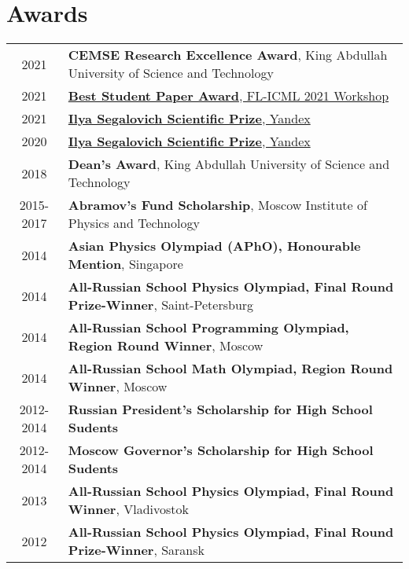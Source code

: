 \documentclass[a4paper,10pt]{article} %
\begin{document}
\section{Awards}
\hypersetup{colorlinks,breaklinks,urlcolor=black,linkcolor=black}
\begin{tabular}{cl}
	\textsc{2021} & \textbf{CEMSE Research Excellence Award}, King Abdullah University of Science and Technology\\
	\textsc{2021} & \href{http://federated-learning.org/fl-icml-2021/}{\textbf{Best Student Paper Award}, FL-ICML 2021 Workshop}\\
	\textsc{2021} & \href{https://yandex.ru/scholarships/scholars}{\textbf{Ilya Segalovich Scientific Prize}, Yandex} \\
	\textsc{2020} & \href{https://yandex.ru/scholarships/scholars}{\textbf{Ilya Segalovich Scientific Prize}, Yandex}\\
	\textsc{2018} & {\bf Dean's Award}, King Abdullah University of Science and Technology\\
	\textsc{2015-2017} & \textbf{Abramov’s Fund Scholarship}, Moscow Institute of Physics and Technology\\
	\textsc{2014} & \textbf{Asian Physics Olympiad (APhO), Honourable Mention}, Singapore\\
	\textsc{2014} & \textbf{All-Russian School Physics Olympiad, Final Round Prize-Winner}, Saint-Petersburg\\
	\textsc{2014} & \textbf{All-Russian School Programming Olympiad, Region Round Winner}, Moscow\\
	\textsc{2014} & \textbf{All-Russian School Math Olympiad, Region Round Winner}, Moscow\\
	\textsc{2012-2014} & \textbf{Russian President’s Scholarship for High School Sudents}\\
	\textsc{2012-2014} & \textbf{Moscow Governor’s Scholarship for High School Sudents}\\
	\textsc{2013} & \textbf{All-Russian School Physics Olympiad, Final Round Winner}, Vladivostok\\
	\textsc{2012} & \textbf{All-Russian School Physics Olympiad, Final Round Prize-Winner}, Saransk\\
\end{tabular}
\hypersetup{colorlinks,breaklinks,urlcolor=linkcolour,linkcolor=linkcolour}

\newpage




\end{document}
